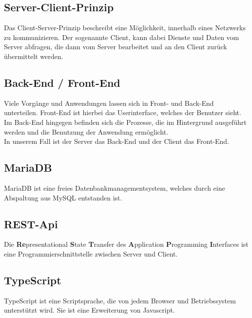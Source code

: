 \documentclass[11pt,a4paper]{report}
\begin{document}
	\subsection*{Server-Client-Prinzip}
	Das Client-Server-Prinzip beschreibt eine Möglichkeit, innerhalb eines Netzwerks zu kommunizieren. 
	Der sogenannte Client, kann dabei Dienste und Daten vom Server abfragen, die dann vom Server bearbeitet und an den Client zurück übermittelt werden.
	
	\subsection*{Back-End / Front-End}
	Viele Vorgänge und Anwendungen lassen sich in Front- und Back-End unterteilen. 
	Front-End ist hierbei das Userinterface, welches der Benutzer sieht.\\
	Im Back-End hingegen befinden sich die Prozesse, die im Hintergrund ausgeführt werden und die Benutzung der Anwendung ermöglicht.\\
	In unserem Fall ist der Server das Back-End und der Client das Front-End.
	
	\subsection*{MariaDB}
	MariaDB ist eine freies Datenbankmanagementsystem, welches durch eine Abspaltung aus MySQL entstanden ist.
	
	\subsection*{REST-Api}
	Die \textbf{Re}presentational \textbf{S}tate \textbf{T}ransfer des \textbf{A}pplication \textbf{P}rogramming \textbf{I}nterfaces ist eine Programmierschnittstelle zwischen Server und Client.
	
	\subsection*{TypeScript}
	TypeScript ist eine Scriptsprache, die von jedem Browser und Betriebssystem unterstützt wird. 
	Sie ist eine Erweiterung von Javascript.
\end{document}

